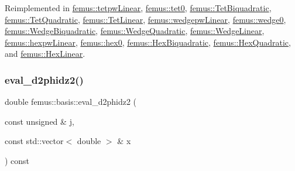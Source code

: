 Reimplemented in \mbox{\hyperlink{classfemus_1_1tetpw_linear_aca0418b87538842e22d123a82a5cb579}{femus\+::tetpw\+Linear}}, \mbox{\hyperlink{classfemus_1_1tet0_af44ea8094a0f62c9bc345df68798359c}{femus\+::tet0}}, \mbox{\hyperlink{classfemus_1_1_tet_biquadratic_a55de22b4a8a1d393548efcfa8f5a20c6}{femus\+::\+Tet\+Biquadratic}}, \mbox{\hyperlink{classfemus_1_1_tet_quadratic_a28d5ce1ce6ee178377194fa24fa9ca10}{femus\+::\+Tet\+Quadratic}}, \mbox{\hyperlink{classfemus_1_1_tet_linear_a70ae26a7051a2bf183d18e21c2d59822}{femus\+::\+Tet\+Linear}}, \mbox{\hyperlink{classfemus_1_1wedgepw_linear_ab511f6122a3e02fc3f36b9477d2f056c}{femus\+::wedgepw\+Linear}}, \mbox{\hyperlink{classfemus_1_1wedge0_a8b230fe06bdf7e089010f19ac81f6e64}{femus\+::wedge0}}, \mbox{\hyperlink{classfemus_1_1_wedge_biquadratic_a56c62427ea3790f8500404d330b81439}{femus\+::\+Wedge\+Biquadratic}}, \mbox{\hyperlink{classfemus_1_1_wedge_quadratic_a731f4fc4d70b8296ecaff5e7e70ef9f9}{femus\+::\+Wedge\+Quadratic}}, \mbox{\hyperlink{classfemus_1_1_wedge_linear_a9f9a44123df2166e874a72a1b64e2366}{femus\+::\+Wedge\+Linear}}, \mbox{\hyperlink{classfemus_1_1hexpw_linear_abf571d202f00205f9befd746266744a6}{femus\+::hexpw\+Linear}}, \mbox{\hyperlink{classfemus_1_1hex0_a925359d6a2443d05fa45262a8a8da65c}{femus\+::hex0}}, \mbox{\hyperlink{classfemus_1_1_hex_biquadratic_a5281e98ab81a4e3cf554534176d63106}{femus\+::\+Hex\+Biquadratic}}, \mbox{\hyperlink{classfemus_1_1_hex_quadratic_a09580ff5b8c961f7c0cd929b415fc706}{femus\+::\+Hex\+Quadratic}}, and \mbox{\hyperlink{classfemus_1_1_hex_linear_a5d316275c3efe23b97b0aca494e33d8d}{femus\+::\+Hex\+Linear}}.

\mbox{\label{classfemus_1_1basis_a9acc0a686ee2c3f77fd33b594c5e2ec3}} 
\subsubsection{\texorpdfstring{eval\+\_\+d2phidz2()}{eval\_d2phidz2()}\hspace{0.1cm}{\footnotesize\ttfamily [1/2]}}
{\footnotesize\ttfamily double femus\+::basis\+::eval\+\_\+d2phidz2 (\begin{DoxyParamCaption}\item[{const unsigned \&}]{j,  }\item[{const std\+::vector$<$ double $>$ \&}]{x }\end{DoxyParamCaption}) const\hspace{0.3cm}{\ttfamily [inline]}}

